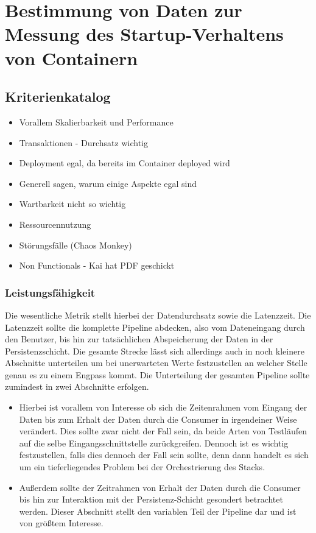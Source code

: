 \section{Bestimmung von Daten zur Messung des Startup-Verhaltens von Containern}
\subsection{Kriterienkatalog}
\begin{itemize}
  \item Vorallem Skalierbarkeit und Performance
  \item Transaktionen - Durchsatz wichtig
  \item Deployment egal, da bereits im Container deployed wird
  \item Generell sagen, warum einige Aspekte egal sind
  \item Wartbarkeit nicht so wichtig
  \item Ressourcennutzung
  \item St\"orungsf\"alle (Chaos Monkey)
  \item Non Functionals - Kai hat PDF geschickt
\end{itemize}

\subsubsection{Leistungsfähigkeit}
Die wesentliche Metrik stellt hierbei der Datendurchsatz sowie die Latenzzeit. Die Latenzzeit sollte die komplette Pipeline abdecken, also vom Dateneingang durch den Benutzer, bis hin zur tatsächlichen Abspeicherung der Daten in der Persistenzschicht. Die gesamte Strecke lässt sich allerdings auch in noch kleinere Abschnitte unterteilen um bei unerwarteten Werte festzustellen an welcher Stelle genau es zu einem Engpass kommt. Die Unterteilung der gesamten Pipeline sollte zumindest in zwei Abschnitte erfolgen.

\begin{itemize}
  \item Hierbei ist vorallem von Interesse ob sich die Zeitenrahmen vom Eingang der Daten bis zum Erhalt der Daten durch die Consumer in irgendeiner Weise verändert. Dies sollte zwar nicht der Fall sein, da beide Arten von Testläufen auf die selbe Eingangsschnittstelle zurückgreifen. Dennoch ist es wichtig festzustellen, falls dies dennoch der Fall sein sollte, denn dann handelt es sich um ein tieferliegendes Problem bei der Orchestrierung des Stacks.
  \item Außerdem sollte der Zeitrahmen von Erhalt der Daten durch die Consumer bis hin zur Interaktion mit der Persistenz-Schicht gesondert betrachtet werden. Dieser Abschnitt stellt den variablen Teil der Pipeline dar und ist von größtem Interesse. 
\end{itemize}

